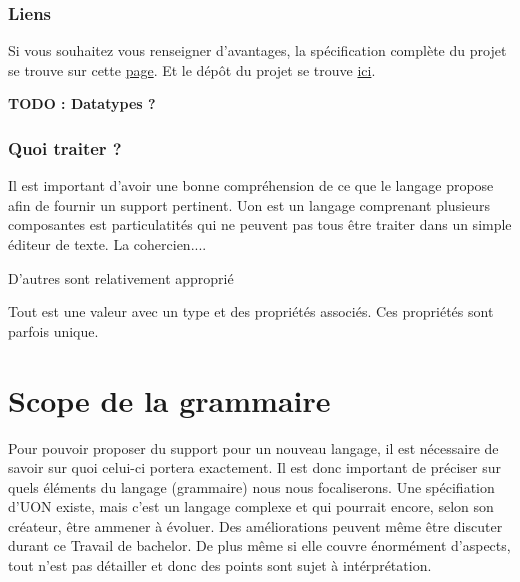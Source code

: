 \documentclass[
    iict, %
    il, %
]{heig-tb}
\begin{document}
\subsection{Liens}
Si vous souhaitez vous renseigner d'avantages, la spécification complète du projet se trouve sur cette \href{https://github.com/uon-language/specification/}{page}.
Et le dépôt du projet se trouve \href{https://github.com/uon-language/specification}{ici}.

\textbf{TODO : Datatypes ?}

\subsection{Quoi traiter ?}
Il est important d'avoir une bonne compréhension de ce que le langage propose afin de fournir un support pertinent.
Uon est un langage comprenant plusieurs composantes est particulatités qui ne peuvent pas tous être traiter dans un simple éditeur de texte.
La cohercien....

D'autres sont relativement approprié

Tout est une valeur avec un type et des propriétés associés. Ces propriétés sont parfois unique.






\chapter{Scope de la grammaire}\label{grammar scope}
Pour pouvoir proposer du support pour un nouveau langage, il est nécessaire de savoir sur quoi celui-ci portera exactement.
Il est donc important de préciser sur quels éléments du langage (grammaire) nous nous focaliserons.
Une spécifiation d'UON existe, mais c'est un langage complexe et qui pourrait encore, selon son créateur, être ammener à évoluer.
Des améliorations peuvent même être discuter durant ce Travail de bachelor.
De plus même si elle couvre énormément d'aspects, tout n'est pas détailler et donc des points sont sujet à intérprétation.
\end{document}
